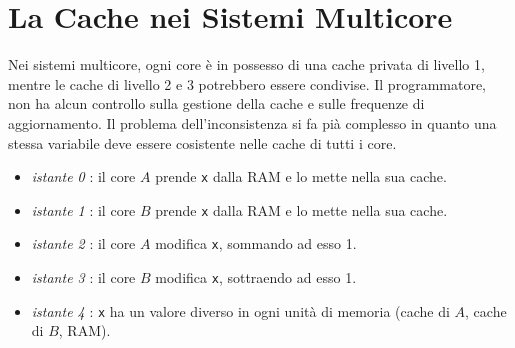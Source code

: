 \documentclass[10pt, letterpaper]{report}
\begin{document}
\section{La Cache nei Sistemi Multicore}
Nei sistemi multicore, ogni core è in possesso di una cache privata di livello 1, mentre le cache di livello 2 e 3 potrebbero essere condivise. Il programmatore, non ha alcun controllo sulla gestione della cache e sulle frequenze di aggiornamento. Il problema dell'inconsistenza si fa pià complesso in quanto una stessa variabile deve essere cosistente nelle cache di tutti i core.\begin{itemize}
    \item \textit{istante 0} : il core $A$ prende \texttt{x} dalla RAM e lo mette nella sua cache. 
    \item \textit{istante 1} : il core $B$ prende \texttt{x} dalla RAM e lo mette nella sua cache. 
    \item \textit{istante 2} : il core $A$ modifica \texttt{x}, sommando ad esso 1.
    \item \textit{istante 3} : il core $B$ modifica \texttt{x}, sottraendo ad esso 1. 
    \item \textit{istante 4} : \texttt{x} ha un valore diverso in ogni unità di memoria (cache di $A$, cache di $B$, RAM).
\end{itemize}
\end{document}
